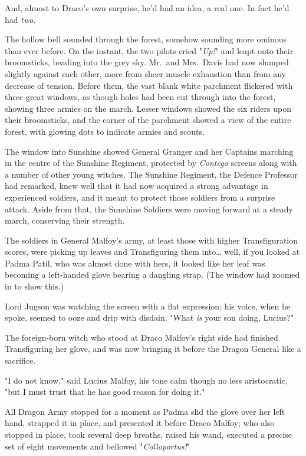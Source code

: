 And, almost to Draco's own surprise, he'd had an idea, a real one. In fact he'd
had \emph{two.}

The hollow bell sounded through the forest, somehow sounding more ominous than
ever before. On the instant, the two pilots cried "\emph{Up!}" and leapt onto
their broomsticks, heading into the grey sky.
\later
Mr.~and Mrs.~Davis had now slumped slightly against each other, more from sheer
muscle exhaustion than from any decrease of tension. Before them, the vast
blank white parchment flickered with three great windows, as though holes had
been cut through into the forest, showing three armies on the march. Lesser
windows showed the six riders upon their broomsticks, and the corner of the
parchment showed a view of the entire forest, with glowing dots to indicate
armies and scouts.

The window into Sunshine showed General Granger and her Captains marching in
the centre of the Sunshine Regiment, protected by \emph{Contego} screens along
with a number of other young witches. The Sunshine Regiment, the Defence
Professor had remarked, knew well that it had now acquired a strong advantage
in experienced soldiers, and it meant to protect those soldiers from a surprise
attack. Aside from that, the Sunshine Soldiers were moving forward at a steady
march, conserving their strength.

The soldiers in General Malfoy's army, at least those with higher
Transfiguration scores, were picking up leaves and Transfiguring them
into{\ldots} well, if you looked at Padma Patil, who was almost done with hers,
it looked like her leaf was becoming a left-handed glove bearing a dangling
strap. (The window had zoomed in to show this.)

Lord Jugson was watching the screen with a flat expression; his voice, when he
spoke, seemed to ooze and drip with disdain. "What \emph{is} your son doing,
Lucius?"

The foreign-born witch who stood at Draco Malfoy's right side had finished
Transfiguring her glove, and was now bringing it before the Dragon General like
a sacrifice.

"I do not know," said Lucius Malfoy, his tone calm though no less aristocratic,
"but I must trust that he has good reason for doing it."

All Dragon Army stopped for a moment as Padma slid the glove over her left
hand, strapped it in place, and presented it before Draco Malfoy; who also
stopped in place, took several deep breaths, raised his wand, executed a
precise set of eight movements and bellowed "\emph{Colloportus!}"

